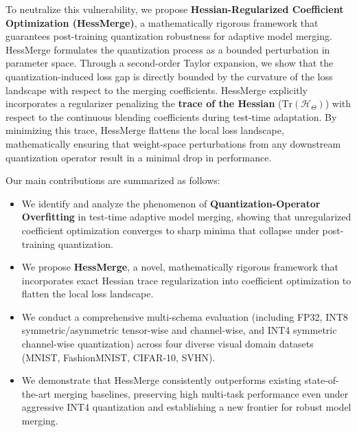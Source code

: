 To neutralize this vulnerability, we propose \textbf{Hessian-Regularized Coefficient Optimization (HessMerge)}, a mathematically rigorous framework that guarantees post-training quantization robustness for adaptive model merging. HessMerge formulates the quantization process as a bounded perturbation in parameter space. Through a second-order Taylor expansion, we show that the quantization-induced loss gap is directly bounded by the curvature of the loss landscape with respect to the merging coefficients. HessMerge explicitly incorporates a regularizer penalizing the \textbf{trace of the Hessian} ($\text{Tr}(\mathcal{H}_{\Theta})$) with respect to the continuous blending coefficients during test-time adaptation. By minimizing this trace, HessMerge flattens the local loss landscape, mathematically ensuring that weight-space perturbations from any downstream quantization operator result in a minimal drop in performance.

Our main contributions are summarized as follows:
\begin{itemize}
    \item We identify and analyze the phenomenon of \textbf{Quantization-Operator Overfitting} in test-time adaptive model merging, showing that unregularized coefficient optimization converges to sharp minima that collapse under post-training quantization.
    \item We propose \textbf{HessMerge}, a novel, mathematically rigorous framework that incorporates exact Hessian trace regularization into coefficient optimization to flatten the local loss landscape.
    \item We conduct a comprehensive multi-schema evaluation (including FP32, INT8 symmetric/asymmetric tensor-wise and channel-wise, and INT4 symmetric channel-wise quantization) across four diverse visual domain datasets (MNIST, FashionMNIST, CIFAR-10, SVHN).
    \item We demonstrate that HessMerge consistently outperforms existing state-of-the-art merging baselines, preserving high multi-task performance even under aggressive INT4 quantization and establishing a new frontier for robust model merging.
\end{itemize}
